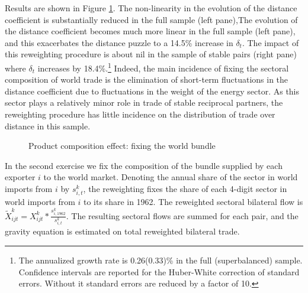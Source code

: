 \documentclass[12pt,twoside,a4paper,notitlepage]{article}
\begin{document}
Results are shown in Figure \ref{fig:compworld}.
 The non-linearity in the evolution of the distance coefficient is substantially reduced in the full sample (left pane),\fi The evolution of the distance coefficient becomes much more linear in the full sample (left pane), and this exacerbates the distance puzzle to a 14.5\% increase in $\delta_t$.
The impact of this reweighting procedure is about nil in the sample of stable pairs (right pane) where $\delta_t$ increases by 18.4\%.\footnote{The annualized growth rate is 0.26(0.33)\% in the full (superbalanced) sample.
Confidence intervals are reported for the Huber-White correction of standard errors.
Without it standard errors are reduced by a factor of 10.}
Indeed, the main incidence of fixing the sectoral composition of world trade is the elimination of short-term fluctuations in the distance coefficient due to fluctuations in the weight of the energy sector.
As this sector plays a relatively minor role in trade of stable reciprocal partners, the reweighting procedure has little incidence on the distribution of trade over distance in this sample.

\begin{figure}[h!]
\caption{Product composition effect: fixing the world bundle  \label{fig:compworld}}
\begin{center}
\setlength{\fboxrule}{1pt} %
\setlength{\fboxsep}{.1in} %
\end{center}
\end{figure}

In the second exercise we fix the composition of the bundle supplied by each exporter $i$ to the world market.
Denoting the annual share of the sector in world imports from $i$ by $s^{k}_{i,t}$, the reweighting fixes the share of each 4-digit sector in world imports from $i$ to its share in 1962.
The reweighted sectoral bilateral flow is $\tilde{X}^k_{ijt}=X^k_{ijt}*\frac{s^k_{i,1962}}{s^k_{i,t}}$.
The resulting sectoral flows are summed for each pair, and the gravity equation is estimated on total reweighted bilateral trade.
 
\end{document}
